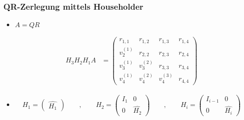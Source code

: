 \setcounter{page}{4}
\begin{frame}
\frametitle{QR-Zerlegung mittels Householder}

\begin{itemize}
	\item $ A = QR $
	
	\begin{align*}
		H_3 H_2 H_1 A &= \left( 
		\begin{array}{cccc}
		r_{1,1} & r_{1,2}  & r_{1,3}  & r_{1,4}  \\ 
		v_2^{(1)} & r_{2,2} & r_{2,3}  & r_{2,4}  \\ 
		v_3^{(1)} & v_3^{(2)} & r_{3,3}  & r_{3,4}  \\ 
		v_4^{(1)} & v_4^{(2)} & v_4^{(3)} & r_{4,4} 
		\end{array}
		\right)
	\end{align*} 
	
	\item
	\begin{align*}
	H_1 = \begin{pmatrix}
	\hat{H_1} 
	\end{pmatrix} \qquad , \qquad
	H_2 = \left(\begin{array}{l|l}
	I_{1} & 0\\ \hline
	0 & \hat{H_2} 	
	\end{array} \right)\qquad , \qquad
	H_i = \left(\begin{array}{l|l}
	I_{i-1} & 0\\ \hline
	0 & \hat{H_i} 	
	\end{array} \right)
	\end{align*}
\end{itemize}
\end{frame}




